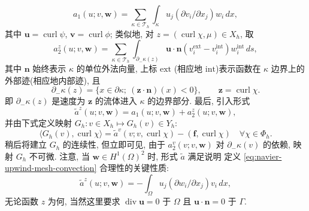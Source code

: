 \begin{equation}\label{eq:navier-upwind-volume-form}
a_1(u;v,\boldsymbol w)
=\sum_{\kappa\in\mathcal T_h}\int_\kappa
u_j(\partial v_i/\partial x_j)w_i\,dx,
\end{equation}
其中 $\boldsymbol u=\operatorname{curl}\psi$, $\boldsymbol v=\operatorname{curl}\phi$;
类似地, 对 $z=(\operatorname{curl}\chi,\mu)\in X_h$, 取
\begin{equation}\label{eq:navier-upwind-boundary-form}
a_2^z(u;v,\boldsymbol w)
=\sum_{\kappa\in\mathcal T_h}\int_{\partial_-\kappa(z)}
\boldsymbol u\cdot\boldsymbol n
(v_i^{\mathrm{ext}}-v_i^{\mathrm{int}})w_i^{\mathrm{int}}\,ds,
\end{equation}
其中 $\boldsymbol n$ 始终表示 $\kappa$ 的单位外法向量, 上标 $\mathrm{ext}$
(相应地 $\mathrm{int}$)表示函数在 $\kappa$ 边界上的外部迹(相应地内部迹), 且
\begin{equation}\label{eq:navier-upwind-element-inflow}
\partial_-\kappa(z)
=\{x\in\partial\kappa;\ (\boldsymbol z\cdot\boldsymbol n)(x)<0\},
\qquad \boldsymbol z=\operatorname{curl}\chi.
\end{equation}
即 $\partial_-\kappa(z)$ 是速度为 $\boldsymbol z$ 的流体进入 $\kappa$ 的边界部分.
最后, 引入形式
\begin{equation}\label{eq:navier-upwind-combined-form}
\widetilde a^z(u;v,\boldsymbol w)
=a_1(u;v,\boldsymbol w)+a_2^z(u;v,\boldsymbol w),
\end{equation}
并由下式定义映射 $G_h:v\in X_h\mapsto G_h(v)\in Y_h$:
\begin{equation}\label{eq:navier-upwind-discrete-nonlinearity}
\langle G_h(v),\operatorname{curl}\chi\rangle
=\widetilde a^v(v;v,\operatorname{curl}\chi)
-(\boldsymbol f,\operatorname{curl}\chi)
\quad\forall\chi\in\Phi_h.
\end{equation}
稍后将建立 $G_h$ 的连续性, 但立即可见, 由于
$a_2^v(v;v,\boldsymbol w)$ 对 $\partial_-\kappa(v)$ 的依赖, 映射 $G_h$ 不可微.
注意, 当 $\boldsymbol w\in H^1(\Omega)^2$ 时, 形式 $\widetilde a$ 满足说明
定义 \eqref{eq:navier-upwind-mesh-convection} 合理性的关键性质:
\begin{equation}\label{eq:navier-upwind-integration-by-parts}
\widetilde a^z(u;v,\boldsymbol w)
=-\int_\Omega u_j(\partial w_i/\partial x_j)v_i\,dx,
\end{equation}
无论函数 $z$ 为何, 当然这里要求
$\operatorname{div}\boldsymbol u=0$ 于 $\Omega$ 且
$\boldsymbol u\cdot\boldsymbol n=0$ 于 $\Gamma$.


